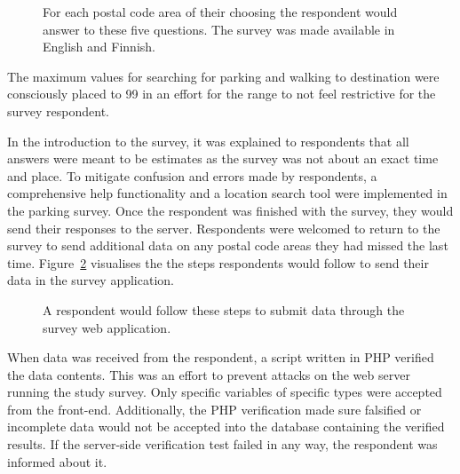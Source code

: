 \begin{figure}[H]%
    \centering
    \qquad
    \caption[Research survey questions in the web application]{For each postal code area of their choosing the respondent would answer to these five questions. The survey was made available in English and Finnish.}%
    \label{fig:js_survey_questions}%
\end{figure}

The maximum values for searching for parking and walking to destination were consciously placed to 99 in an effort for the range to not feel restrictive for the survey respondent.

In the introduction to the survey, it was explained to respondents that all answers were meant to be estimates as the survey was not about an exact time and place. To mitigate confusion and errors made by respondents, a comprehensive help functionality and a location search tool were implemented in the parking survey. Once the respondent was finished with the survey, they would send their responses to the server. Respondents were welcomed to return to the survey to send additional data on any postal code areas they had missed the last time. Figure~\ref{fig:survey_process} visualises the the steps respondents would follow to send their data in the survey application.

\begin{figure}[H]%
    \centering
    \quad
    \quad
    \quad
    \caption[Steps to fill out the survey]{A respondent would follow these steps to submit data through the survey web application.}%
    \label{fig:survey_process}%
\end{figure}

When data was received from the respondent, a script written in PHP verified the data contents. This was an effort to prevent attacks on the web server running the study survey. Only specific variables of specific types were accepted from the front-end. Additionally, the PHP verification made sure falsified or incomplete data would not be accepted into the database containing the verified results. If the server-side verification test failed in any way, the respondent was informed about it. 

